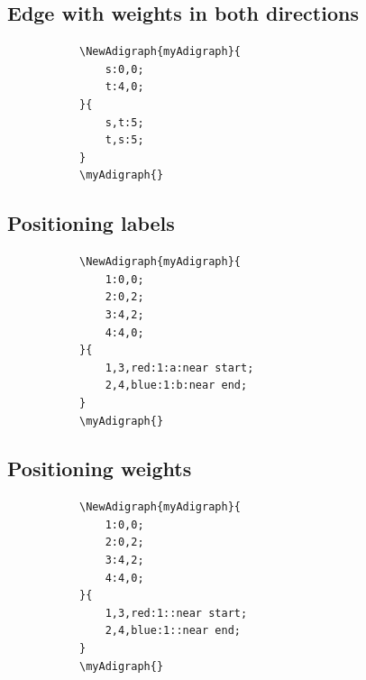 \documentclass{report}
\begin{document}
\subsection{Edge with weights in both directions}
\begin{figure}
	\begin{subfigure}{0.49\textwidth}
		\begin{verbatim}
\NewAdigraph{myAdigraph}{
 	s:0,0;
 	t:4,0;
}{
	s,t:5;
	t,s:5;
}
\myAdigraph{}
\end{verbatim}
	\end{subfigure}
	\begin{subfigure}{0.49\textwidth}
		\myAdigraph{}
	\end{subfigure}
\end{figure}

\subsection{Positioning labels}
\begin{figure}
	\begin{subfigure}{0.49\textwidth}
		\begin{verbatim}
\NewAdigraph{myAdigraph}{
	1:0,0;
	2:0,2;
	3:4,2;
	4:4,0;
}{
	1,3,red:1:a:near start;
	2,4,blue:1:b:near end;
}
\myAdigraph{}
\end{verbatim}
	\end{subfigure}
	\begin{subfigure}{0.49\textwidth}
		\myAdigraph{}
	\end{subfigure}
\end{figure}

\subsection{Positioning weights}
\begin{figure}
	\begin{subfigure}{0.49\textwidth}
		\begin{verbatim}
\NewAdigraph{myAdigraph}{
	1:0,0;
	2:0,2;
	3:4,2;
	4:4,0;
}{
	1,3,red:1::near start;
	2,4,blue:1::near end;
}
\myAdigraph{}
\end{verbatim}
	\end{subfigure}
	\begin{subfigure}{0.49\textwidth}
		\myAdigraph{}
	\end{subfigure}
\end{figure}
\end{document}
